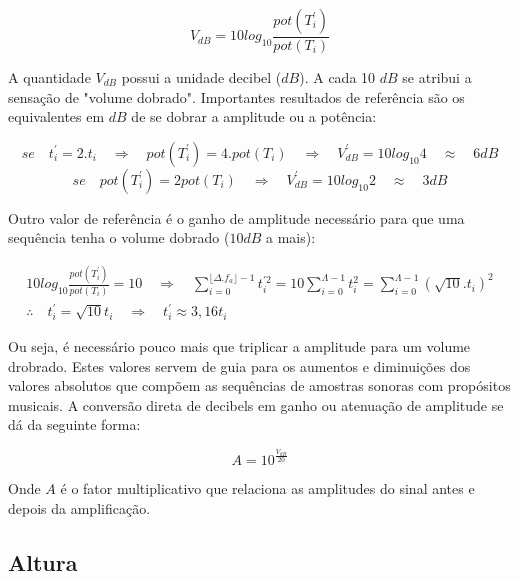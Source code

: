 \begin{equation}\label{decibels}
V_{dB}=10log_{10}\frac{pot(T^{'}_i)}{pot(T_i)}
\end{equation}

A quantidade $V_{dB}$ possui a unidade decibel ($dB$). A cada 10 $dB$ se atribui
a sensação de "volume dobrado". Importantes resultados de referência são os equivalentes em $dB$ de se dobrar
a amplitude ou a potência:

\begin{equation}\label{eq:ampVol}
se \quad  t_i^{'}=2 . t_i \quad \Rightarrow \quad pot(T^{'}_i)=4 . pot(T_i) \quad \Rightarrow \quad V^{'}_{dB}=10log_{10} 4 \quad  \approx \quad 6 dB
\end{equation}
\begin{equation}\label{eq:potVol}
se \quad pot(T^{'}_i)=2 pot(T_i) \quad \Rightarrow \quad V^{'}_{dB}=10log_{10} 2 \quad \approx \quad 3 dB
\end{equation}

Outro valor de referência é o ganho de amplitude
necessário para que uma sequência tenha o volume dobrado ($10dB$ a mais):

\begin{align}
10log_{10}\frac{pot(T^{'}_i)}{pot(T_i)} = 10 \quad \Rightarrow \quad \sum_{i=0}^{\lfloor \Delta.f_a \rfloor -1}t^{'2}_i=10\sum_{i=0}^{\Lambda-1}t_i^2=\sum_{i=0}^{\Lambda-1}(\sqrt{10}.t_i)^2 \label{eq:dobraAmp}\\
\therefore \quad t^{'}_i=\sqrt{10}t_i \quad \Rightarrow \quad t^{'}_i \approx 3,16t_i\label{eq:dobraVol}
\end{align}

Ou seja, é necessário pouco mais que triplicar a amplitude para um volume drobrado.
Estes valores servem de guia para os aumentos e diminuições dos valores absolutos que compõem as
sequências de amostras sonoras com propósitos musicais. A conversão direta de decibels
em ganho ou atenuação de amplitude se dá da seguinte forma:

\begin{equation}\label{ampDec}
A = 10^{\frac{V_{dB}}{20}}
\end{equation}

Onde $A$ é o fator multiplicativo que relaciona as amplitudes do sinal antes e depois da amplificação.

\subsection{Altura}

